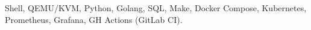 Shell, QEMU/KVM, Python, Golang, SQL, Make, Docker Compose, Kubernetes, Prometheus, Grafana, GH Actions (GitLab CI).
